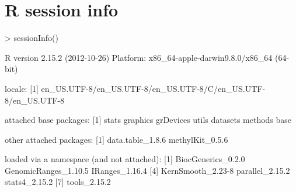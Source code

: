 \documentclass{article}
\begin{document}
\section{R session info}
\begin{Schunk}
\begin{Sinput}
> sessionInfo() 
\end{Sinput}
\begin{Soutput}
R version 2.15.2 (2012-10-26)
Platform: x86_64-apple-darwin9.8.0/x86_64 (64-bit)

locale:
[1] en_US.UTF-8/en_US.UTF-8/en_US.UTF-8/C/en_US.UTF-8/en_US.UTF-8

attached base packages:
[1] stats     graphics  grDevices utils     datasets  methods   base     

other attached packages:
[1] data.table_1.8.6 methylKit_0.5.6 

loaded via a namespace (and not attached):
[1] BiocGenerics_0.2.0   GenomicRanges_1.10.5 IRanges_1.16.4      
[4] KernSmooth_2.23-8    parallel_2.15.2      stats4_2.15.2       
[7] tools_2.15.2        
\end{Soutput}
\end{Schunk}


\end{document}
